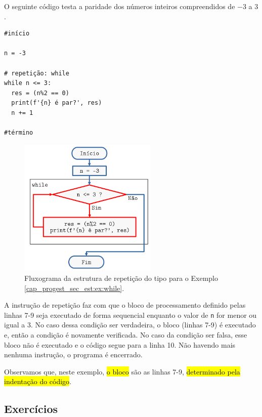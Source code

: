 \begin{ex}\label{cap_progest_sec_est:ex:while}
  O seguinte código testa a paridade dos números inteiros compreendidos de $-3$ a $3$.

\begin{lstlisting}
#início

n = -3

# repetição: while
while n <= 3:
  res = (n%2 == 0)
  print(f'{n} é par?', res)
  n += 1
    
#término
\end{lstlisting}

\begin{figure}[htb]
  \centering
  \includegraphics[width=2.6in]{./cap_progest/dados/fig_fg_while_ex/fig.png}
  \caption{Fluxograma da estrutura de repetição do tipo {\PYTHONwhile} para o Exemplo \ref{cap_progest_sec_est:ex:while}.}
  \label{cap_progest_sec_est:fig:fg_while_ex}
\end{figure}


A instrução de repetição {\PYTHONwhile} faz com que o bloco de processamento definido pelas linhas 7-9 seja executado de forma sequencial enquanto o valor de \texttt{n} for menor ou igual a 3. No caso dessa condição ser verdadeira, o bloco (linhas 7-9) é executado e, então a condição é novamente verificada. No caso da condição ser falsa, esse bloco não é executado e o código segue para a linha 10. Não havendo mais nenhuma instrução, o programa é encerrado.

Observamos que, neste exemplo, \hl{o bloco {\PYTHONwhile}} são as linhas 7-9, \hl{determinado pela indentação do código}.
\end{ex}

\subsection{Exercícios}

